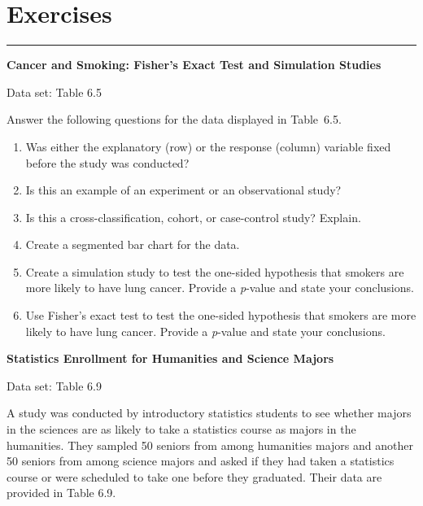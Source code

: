 \documentclass[
]{report}
\let\theexcount\relax
\begin{document}
\section*{\texorpdfstring{\textbf{Exercises}}{Exercises}}\label{exercises-1}

\vspace{-2em}

\noindent

\rule{\linewidth}{0.4pt}

\renewcommand{\theexcount}{E\arabic{excount}}

\begin{list}{E.}{ \setlength{\itemsep}{0.5em}}

  \item \textbf{Cancer and Smoking: Fisher’s Exact Test and Simulation Studies}    

  Data set: Table 6.5    

  Answer the following questions for the data displayed in Table 6.5.  
  \begin{enumerate}
    \item Was either the explanatory (row) or the response (column) variable fixed before the study was conducted?
    \item Is this an example of an experiment or an observational study?
    \item Is this a cross-classification, cohort, or case-control study? Explain.
    \item Create a segmented bar chart for the data.
    \item Create a simulation study to test the one-sided hypothesis that smokers are more likely to have lung cancer. Provide a \textit{p}-value and state your conclusions.
    \item Use Fisher’s exact test to test the one-sided hypothesis that smokers are more likely to have lung cancer. Provide a \textit{p}-value and state your conclusions.
  \end{enumerate}

  \item \textbf{Statistics Enrollment for Humanities and Science Majors}    

  Data set: Table 6.9    

  A study was conducted by introductory statistics students to see whether majors in the sciences are as likely to take a statistics course as majors in the humanities. They sampled 50 seniors from among humanities majors and another 50 seniors from among science majors and asked if they had taken a statistics course or were scheduled to take one before they graduated. Their data are provided in Table 6.9.  
  

\end{list}
\end{document}
